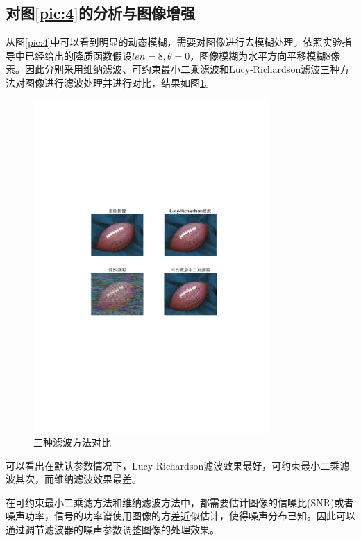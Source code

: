 \documentclass[a4paper]{ctexart}
\begin{document}
\begin{spacing}{1.35}
	\subsection{对图\ref{pic:4}的分析与图像增强}
	从图\ref{pic:4}中可以看到明显的动态模糊，需要对图像进行去模糊处理。依照实验指导中已经给出的降质函数假设$len=8,\theta=0$，图像模糊为水平方向平移模糊8像素。因此分别采用维纳滤波、可约束最小二乘滤波和Lucy-Richardson滤波三种方法对图像进行滤波处理并进行对比，结果如图\ref{fig:4filter}。
	\begin{figure}[htbp]
		\centering
		\includegraphics[width=0.8\textwidth]{figure/4filter.pdf}
		\caption{三种滤波方法对比}\label{fig:4filter}
	\end{figure}
	可以看出在默认参数情况下，Lucy-Richardson滤波效果最好，可约束最小二乘滤波其次，而维纳滤波效果最差。

	在可约束最小二乘滤方法和维纳滤波方法中，都需要估计图像的信噪比(SNR)或者噪声功率，信号的功率谱使用图像的方差近似估计，使得噪声分布已知。因此可以通过调节滤波器的噪声参数调整图像的处理效果。


\end{spacing}
\end{document}
